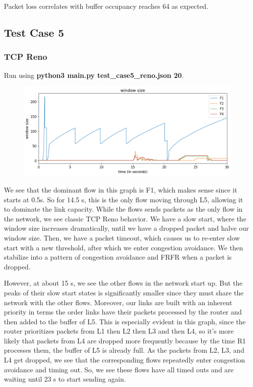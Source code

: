 \documentclass{article}
\begin{document}
Packet loss correlates with buffer occupancy reaches 64 as expected.



\subsection{Test Case 5}

\subsubsection{TCP Reno}

Run using \textbf{python3 main.py test\_case5\_reno.json 20}.

\begin{figure}[H]
\centering
\includegraphics[width = \textwidth]{"test_case5_reno window size"}
\end{figure}

We see that the dominant flow in this graph is F1, which makes sense since it starts at 0.5s. So for 14.5 s, this is the only flow moving through L5, allowing it to dominate the link capacity. While the flows sends packets as the only flow in the network, we see classic TCP Reno behavior. We have a slow start, where the window size increases dramatically, until we have a dropped packet and halve our window size. Then, we have a packet timeout, which causes us to re-enter slow start with a new threshold, after which we enter congestion avoidance. We then stabilize into a pattern of congestion avoidance and FRFR when a packet is dropped.

However, at about 15 s, we see the other flows in the network start up. But the peaks of their slow start states is significantly smaller since they must share the network with the other flows. Moreover, our links are built with an inherent priority in terms the order links have their packets processed by the router and then added to the buffer of L5. This is especially evident in this graph, since the router prioritizes packets from L1 then L2 then L3 and then L4, so it's more likely that packets from L4 are dropped more frequently because by the time R1 processes them, the buffer of L5 is already full. As the packets from L2, L3, and L4 get dropped, we see that the corresponding flows repeatedly enter congestion avoidance and timing out. So, we see these flows have all timed outs and are waiting until 23 s to start sending again.
\end{document}
